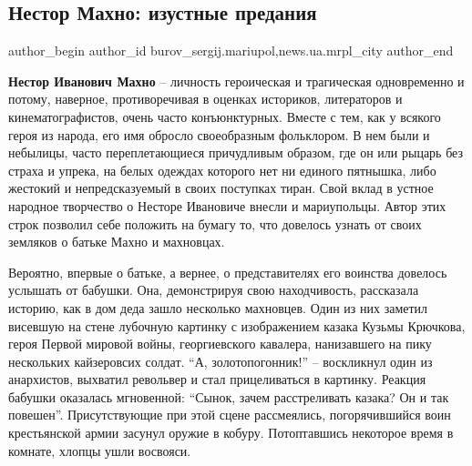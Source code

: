  
 
 
 
 
 
\subsection{Нестор Махно: изустные предания}
\label{sec:21_04_2018.stz.news.ua.mrpl_city.1.nestor_mahno_izustnye_predania}
 
\ifcmt
 author_begin
   author_id burov_sergij.mariupol,news.ua.mrpl_city
 author_end
\fi


\textbf{Нестор Иванович Махно} – личность героическая и трагическая одновременно и
потому, наверное, противоречивая в оценках историков, литераторов и
кинематографистов, очень часто конъюнктурных. Вместе с тем, как у всякого героя
из народа, его имя обросло своеобразным фольклором. В нем были и небылицы,
часто переплетающиеся причудливым образом, где он или рыцарь без страха и
упрека, на белых одеждах которого нет ни единого пятнышка, либо жестокий и
непредсказуемый в своих поступках тиран. Свой вклад в устное народное
творчество о Несторе Ивановиче внесли и мариупольцы. Автор этих строк позволил
себе положить на бумагу то, что довелось узнать от своих земляков о батьке
Махно и махновцах.

Вероятно, впервые о батьке, а вернее, о представителях его воинства довелось
услышать от бабушки. Она, демонстрируя свою находчивость, рассказала историю,
как в дом деда зашло несколько махновцев. Один из них заметил висевшую на стене
лубочную картинку с изображением казака Кузьмы Крючкова, героя Первой мировой
войны, георгиевского кавалера, нанизавшего на пику нескольких кайзеровсих
солдат. \enquote{А, золотопогонник!} – воскликнул один из анархистов, выхватил
револьвер и стал прицеливаться в картинку. Реакция бабушки оказалась
мгновенной: \enquote{Сынок, зачем расстреливать казака? Он и так повешен}.
Присутствующие при этой сцене рассмеялись, погорячившийся воин крестьянской
армии засунул оружие в кобуру. Потоптавшись некоторое время в комнате, хлопцы
ушли восвояси.

